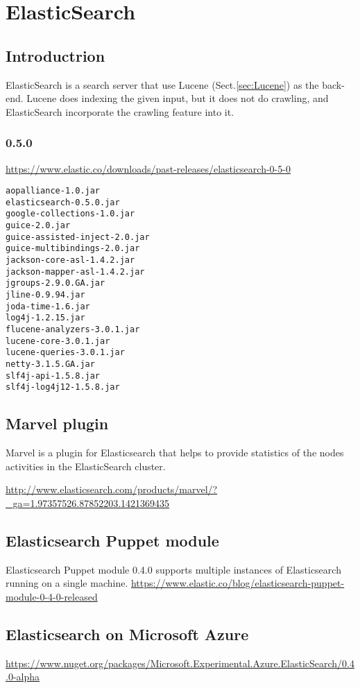 \chapter{ElasticSearch}
\label{chap:elastic_search}

\section{Introductrion}

ElasticSearch is a search server that use Lucene
(Sect.\ref{sec:Lucene}) as the back-end. Lucene does indexing the given input,
but it does not do crawling, and ElasticSearch incorporate the crawling feature
into it.

\subsection{0.5.0}

\url{https://www.elastic.co/downloads/past-releases/elasticsearch-0-5-0}

\begin{verbatim}
aopalliance-1.0.jar
elasticsearch-0.5.0.jar
google-collections-1.0.jar
guice-2.0.jar
guice-assisted-inject-2.0.jar
guice-multibindings-2.0.jar
jackson-core-asl-1.4.2.jar
jackson-mapper-asl-1.4.2.jar
jgroups-2.9.0.GA.jar
jline-0.9.94.jar
joda-time-1.6.jar
log4j-1.2.15.jar
flucene-analyzers-3.0.1.jar
lucene-core-3.0.1.jar
lucene-queries-3.0.1.jar
netty-3.1.5.GA.jar
slf4j-api-1.5.8.jar
slf4j-log4j12-1.5.8.jar
\end{verbatim}



\section{Marvel plugin}

Marvel is a plugin for Elasticsearch that helps to provide statistics of the nodes activities
in the ElasticSearch cluster.

\url{http://www.elasticsearch.com/products/marvel/?_ga=1.97357526.87852203.1421369435}

\section{Elasticsearch Puppet module}

Elasticsearch Puppet module 0.4.0 supports multiple instances of Elasticsearch running on a single machine.
\url{https://www.elastic.co/blog/elasticsearch-puppet-module-0-4-0-released}

\section{Elasticsearch on Microsoft Azure}

\url{https://www.nuget.org/packages/Microsoft.Experimental.Azure.ElasticSearch/0.4.0-alpha}
